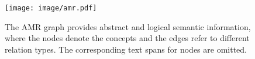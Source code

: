 \begin{figure}[t]
    \centering
    \texttt{[image: image/amr.pdf]}
    \caption{
    The AMR graph provides abstract and logical semantic information, where the nodes denote the concepts and the edges refer to different relation types.
    The corresponding text spans for nodes are omitted.
    }
\label{fig:amr}
\end{figure}